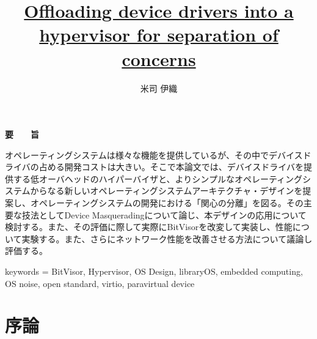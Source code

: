 \documentclass[a4paper,11pt,report]{ltjsbook}
\title{\uline{Offloading device drivers into a hypervisor for separation of concerns}}
\author{米司 伊織}
\begin{document}
\thispagestyle{empty}
\newpage
\thispagestyle{empty}
\begin{minipage}{.8\hsize}
\thispagestyle{empty}
\maketitle
\end{minipage}
\thispagestyle{empty}
\newpage

\thispagestyle{empty}
\vspace*{20pt plus 1fil}
\noindent
\begin{center}
{\Large \bf 要　　旨}
\vspace{2cm}
\end{center}

オペレーティングシステムは様々な機能を提供しているが、その中でデバイスドライバの占める開発コストは大きい。そこで本論文では、デバイスドライバを提供する低オーバヘッドのハイパーバイザと、よりシンプルなオペレーティングシステムからなる新しいオペレーティングシステムアーキテクチャ・デザインを提案し、オペレーティングシステムの開発における「関心の分離」を図る。その主要な技法としてDevice Masqueradingについて論じ、本デザインの応用について検討する。また、その評価に際して実際にBitVisorを改変して実装し、性能について実験する。また、さらにネットワーク性能を改善させる方法について議論し評価する。

keywords = {BitVisor, Hypervisor, OS Design, libraryOS, embedded computing, OS noise, open standard, virtio, paravirtual device}


\par
\vspace{0pt plus 1fil}
\newpage

\tableofcontents
\listoffigures

\pagebreak \setcounter{page}{1}



\chapter{序論}
\end{document}
